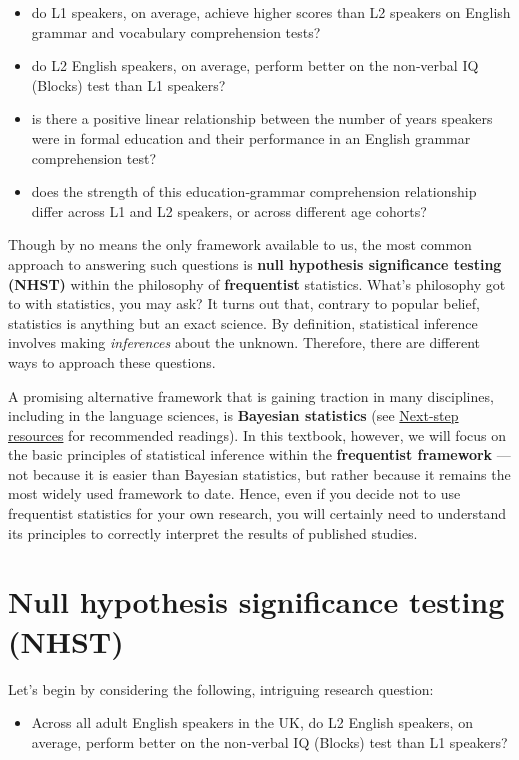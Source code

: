 \documentclass[
  letterpaper,
  DIV=11,
  numbers=noendperiod]{scrreprt}
\providecommand{\tightlist}{%
  \setlength{\itemsep}{0pt}\setlength{\parskip}{0pt}}
\begin{document}
\begin{itemize}
\item
  do L1 speakers, on average, achieve higher scores than L2 speakers on
  English grammar and vocabulary comprehension tests?
\item
  do L2 English speakers, on average, perform better on the non‑verbal
  IQ (Blocks) test than L1 speakers?
\item
  is there a positive linear relationship between the number of years
  speakers were in formal education and their performance in an English
  grammar comprehension test?
\item
  does the strength of this education‑grammar comprehension relationship
  differ across L1 and L2 speakers, or across different age cohorts?
\end{itemize}

Though by no means the only framework available to us, the most common
approach to answering such questions is \textbf{null hypothesis
significance testing (NHST)} within the philosophy of
\textbf{frequentist} statistics. What's philosophy got to with
statistics, you may ask? It turns out that, contrary to popular belief,
statistics is anything but an exact science. By definition, statistical
inference involves making \emph{inferences} about the unknown.
Therefore, there are different ways to approach these questions.

A promising alternative framework that is gaining traction in many
disciplines, including in the language sciences, is \textbf{Bayesian
statistics} (see
\href{https://elenlefoll.github.io/RstatsTextbook/A_FurtherResources.html}{Next-step
resources} for recommended readings). In this textbook, however, we will
focus on the basic principles of statistical inference within the
\textbf{frequentist framework} --- not because it is easier than
Bayesian statistics, but rather because it remains the most widely used
framework to date. Hence, even if you decide not to use frequentist
statistics for your own research, you will certainly need to understand
its principles to correctly interpret the results of published studies.

\section{Null hypothesis significance testing (NHST)}\label{sec-NHST}

Let's begin by considering the following, intriguing research question:

\begin{itemize}
\tightlist
\item
  Across all adult English speakers in the UK, do L2 English speakers,
  on average, perform better on the non‑verbal IQ (Blocks) test than L1
  speakers?
\end{itemize}
\end{document}
